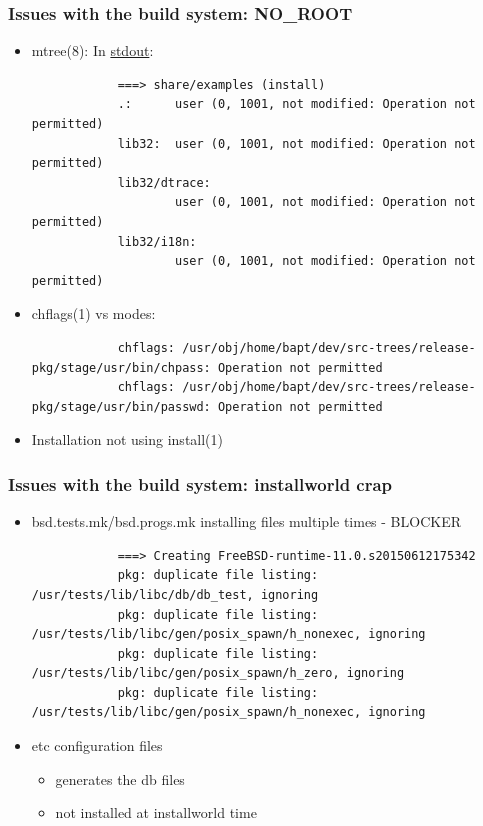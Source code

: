 \begin{frame}[fragile]
	\frametitle{Issues with the build system: NO\_ROOT}
	\begin{itemize}
		\item mtree(8):
			In \underline{stdout}:
			\begin{lstlisting}
			===> share/examples (install)
			.:      user (0, 1001, not modified: Operation not permitted)
			lib32:  user (0, 1001, not modified: Operation not permitted)
			lib32/dtrace: 
			        user (0, 1001, not modified: Operation not permitted)
			lib32/i18n: 
			        user (0, 1001, not modified: Operation not permitted)
			\end{lstlisting}
		\item chflags(1) vs modes:
			\begin{lstlisting}
			chflags: /usr/obj/home/bapt/dev/src-trees/release-pkg/stage/usr/bin/chpass: Operation not permitted
			chflags: /usr/obj/home/bapt/dev/src-trees/release-pkg/stage/usr/bin/passwd: Operation not permitted
			\end{lstlisting}

		\item Installation not using install(1)
	\end{itemize}
\end{frame}

\begin{frame}[fragile]
	\frametitle{Issues with the build system: installworld crap}
	\begin{itemize}
		\item bsd.tests.mk/bsd.progs.mk installing files multiple times - BLOCKER
			\begin{lstlisting}
			===> Creating FreeBSD-runtime-11.0.s20150612175342
			pkg: duplicate file listing: /usr/tests/lib/libc/db/db_test, ignoring
			pkg: duplicate file listing: /usr/tests/lib/libc/gen/posix_spawn/h_nonexec, ignoring
			pkg: duplicate file listing: /usr/tests/lib/libc/gen/posix_spawn/h_zero, ignoring
			pkg: duplicate file listing: /usr/tests/lib/libc/gen/posix_spawn/h_nonexec, ignoring
			\end{lstlisting}
		\item etc configuration files
			\begin{itemize}
				\item{generates the db files}
				\item{not installed at installworld time}
			\end{itemize}
	\end{itemize}
\end{frame}

